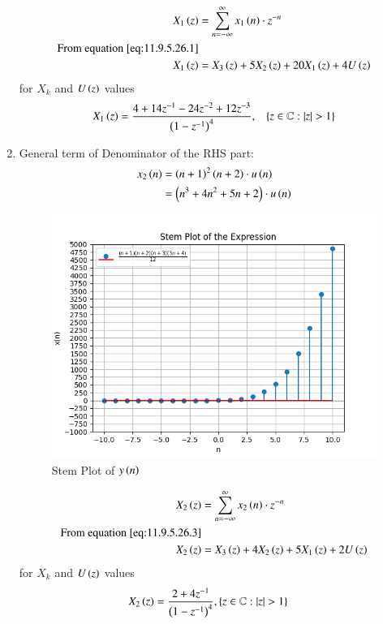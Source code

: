 \documentclass[journal,12pt,twocolumn]{IEEEtran}
\theoremstyle{remark}
\begin{document}
\begin{enumerate}[label=\arabic*.]
\begin{align}
 X_1\left(z\right) &= \sum_{n=-\infty}^\infty x_1\left(n\right)\cdot z^{-n}\\
 \text{From equation \eqref{eq:11.9.5.26.1}}\notag \\
X_1\left(z\right) &= X_3\left(z\right) + 5X_2\left(z\right) + 20X_1\left(z\right) + 4U\left(z\right) \label{eq:11.9.5.26.4} 
\end{align}
 for $X_k$ and $U\left(z\right)$ values 
\begin{align}
    X_1\left(z\right)&= \frac{4+14z^{-1}-24z^{-2}+12z^{-3}}{\left(1-z^{-1}\right)^4} ,&  \left\{z\in\mathbb{C} : \lvert z \rvert > 1\right\} 
\end{align}
\item General term of Denominator of the RHS part:
\begin{align}
    x_2\left(n\right) &= \left(n+1\right)^{2}\left(n+2\right)\cdot u\left(n\right)\\
                &= \left(n^{3}+4n^{2}+5n+2\right)\cdot u\left(n\right) \label{eq:11.9.5.26.3}
\end{align}

\begin{figure}[H]
    \hspace{1cm}
    \includegraphics[width=1\columnwidth]{Figure_2.png}
    \caption{Stem Plot of $y\left(n\right)$}
\end{figure}

\begin{align}
    X_2\left(z\right) &= \sum_{n=-\infty}^\infty x_2\left(n\right)\cdot z^{-n}\\
    \text{From equation \eqref{eq:11.9.5.26.3}}\\
    X_2\left(z\right) &=X_3\left(z\right) + 4X_2\left(z\right) + 5X_1\left(z\right) + 2U\left(z\right)
\end{align}
 for $X_k$ and $U\left(z\right)$ values
\begin{align}
    X_2\left(z\right) &= \frac{2+4z^{-1}}{\left(1-z^{-1}\right)^4},\left\{z\in\mathbb{C} : \lvert z \rvert > 1\right\}   
\end{align}
\end{enumerate}
\end{document}

